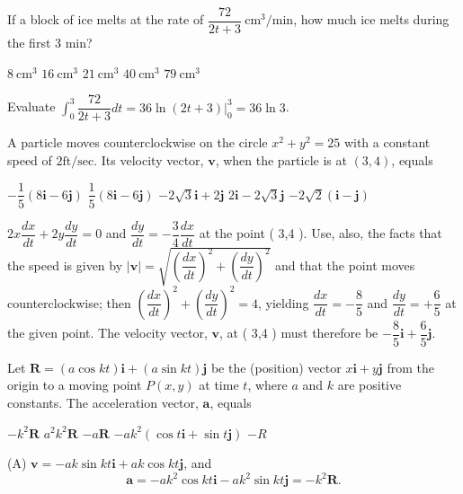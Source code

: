 \question
If a block of ice melts at the rate of $\dfrac{72}{2 t+3} \mathrm{~cm}^{3} / \mathrm{min}$, how much ice melts during the first 3 min?
\begin{choices}
  \choice $8 \mathrm{~cm}^{3}$
  \choice $16 \mathrm{~cm}^{3}$
  \choice $21 \mathrm{~cm}^{3}$
  \choice $40 \mathrm{~cm}^{3}$
  \choice $79 \mathrm{~cm}^{3}$
\end{choices}
\begin{solution}
Evaluate $\displaystyle\int_{0}^{3} \dfrac{72}{2 t+3} d t=\left.36 \ln (2 t+3)\right|_{0} ^{3}=36 \ln 3$.
\end{solution}

\question
A particle moves counterclockwise on the circle $x^{2}+y^{2}=25$ with a constant speed of $2 \mathrm{ft} / \mathrm{sec}$. Its velocity vector, $\mathbf{v}$, when the particle is at $(3,4)$, equals
\begin{choices}
  \choice $-\dfrac{1}{5}(8 \mathbf{i}-6 \mathbf{j})$
  \choice $\dfrac{1}{5}(8 \mathbf{i}-6 \mathbf{j})$
  \choice $-2 \sqrt{3} \mathbf{i}+2 \mathbf{j}$
  \choice $2 \mathbf{i}-2 \sqrt{3} \mathbf{j}$
  \choice $-2 \sqrt{2}(\mathbf{i}-\mathbf{j})$
\end{choices}
\begin{solution}
$2 x \dfrac{d x}{d t}+2 y \dfrac{d y}{d t}=0$ and $\dfrac{d y}{d t}=-\dfrac{3}{4} \dfrac{d x}{d t}$ at the point ( 3,4 ).
Use, also, the facts that the speed is given by $|\mathbf{v}|=\sqrt{\left(\dfrac{d x}{d t}\right)^{2}+\left(\dfrac{d y}{d t}\right)^{2}}$ and that the point moves counterclockwise; then $\left(\dfrac{d x}{d t}\right)^{2}+\left(\dfrac{d y}{d t}\right)^{2}=4$, yielding $\dfrac{d x}{d t}=-\dfrac{8}{5}$ and $\dfrac{d y}{d t}=+\dfrac{6}{5}$ at the given point. The velocity vector, $\mathbf{v}$, at ( 3,4 ) must therefore be $-\dfrac{8}{5} \mathbf{i}+\dfrac{6}{5} \mathbf{j}$.
\end{solution}

\question
Let $\mathbf{R}=(a \cos k t) \mathbf{i}+(a \sin k t) \mathbf{j}$ be the (position) vector $x \mathbf{i}+y \mathbf{j}$ from the origin to a moving point $P(x, y)$ at time $t$, where $a$ and $k$ are positive constants. The acceleration vector, $\mathbf{a}$, equals
\begin{choices}
  \choice $-k^{2} \mathbf{R}$
  \choice $a^{2} k^{2} \mathbf{R}$
  \choice $-a \mathbf{R}$
  \choice $-a k^{2}(\cos t \mathbf{i}+\sin t \mathbf{j})$
  \choice $-R$
\end{choices}
\begin{solution}
(A) $\mathbf{v}=-a k \sin k t \mathbf{i}+a k \cos k t \mathbf{j}$, and
\[
\mathbf{a}=-a k^{2} \cos k t \mathbf{i}-a k^{2} \sin k t \mathbf{j}=-k^{2} \mathbf{R} .
\]
\end{solution}






